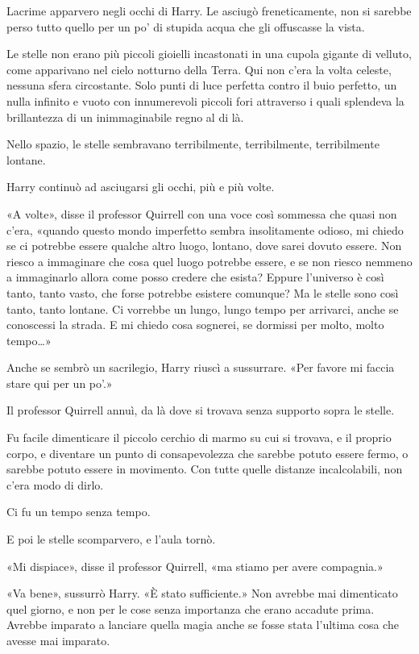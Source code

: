 Lacrime apparvero negli occhi di Harry. Le asciugò freneticamente, non si sarebbe perso tutto quello per un po’ di stupida acqua che gli offuscasse la vista.

Le stelle non erano più piccoli gioielli incastonati in una cupola gigante di velluto, come apparivano nel cielo notturno della Terra. Qui non c’era la volta celeste, nessuna sfera circostante. Solo punti di luce perfetta contro il buio perfetto, un nulla infinito e vuoto con innumerevoli piccoli fori attraverso i quali splendeva la brillantezza di un inimmaginabile regno al di là.

Nello spazio, le stelle sembravano terribilmente, terribilmente, terribilmente lontane.

Harry continuò ad asciugarsi gli occhi, più e più volte.

«A volte», disse il professor Quirrell con una voce così sommessa che quasi non c’era, «quando questo mondo imperfetto sembra insolitamente odioso, mi chiedo se ci potrebbe essere qualche altro luogo, lontano, dove sarei dovuto essere. Non riesco a immaginare che cosa quel luogo potrebbe essere, e se non riesco nemmeno a immaginarlo allora come posso credere che esista? Eppure l’universo è così tanto, tanto vasto, che forse potrebbe esistere comunque? Ma le stelle sono così tanto, tanto lontane. Ci vorrebbe un lungo, lungo tempo per arrivarci, anche se conoscessi la strada. E mi chiedo cosa sognerei, se dormissi per molto, molto tempo…»

Anche se sembrò un sacrilegio, Harry riuscì a sussurrare. «Per favore mi faccia stare qui per un po’.»

Il professor Quirrell annuì, da là dove si trovava senza supporto sopra le stelle.

Fu facile dimenticare il piccolo cerchio di marmo su cui si trovava, e il proprio corpo, e diventare un punto di consapevolezza che sarebbe potuto essere fermo, o sarebbe potuto essere in movimento. Con tutte quelle distanze incalcolabili, non c’era modo di dirlo.

Ci fu un tempo senza tempo.

E poi le stelle scomparvero, e l’aula tornò.

«Mi dispiace», disse il professor Quirrell, «ma stiamo per avere compagnia.»

«Va bene», sussurrò Harry. «È stato sufficiente.» Non avrebbe mai dimenticato quel giorno, e non per le cose senza importanza che erano accadute prima. Avrebbe imparato a lanciare quella magia anche se fosse stata l’ultima cosa che avesse mai imparato.

